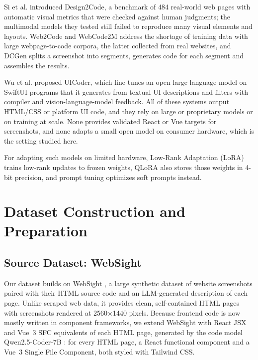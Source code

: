 \documentclass[conference,a4paper]{IEEEtran}
\begin{document}
Si et al. \cite{si2025design2code} introduced Design2Code, a benchmark of 484 real-world web pages with automatic visual metrics that were checked against human judgments; the multimodal models they tested still failed to reproduce many visual elements and layouts. Web2Code \cite{yun2024web2code} and WebCode2M \cite{gui2025webcode2m} address the shortage of training data with large webpage-to-code corpora, the latter collected from real websites, and DCGen \cite{wan2025dcgen} splits a screenshot into segments, generates code for each segment and assembles the results.

Wu et al. \cite{wu2024uicoder} proposed UICoder, which fine-tunes an open large language model on SwiftUI programs that it generates from textual UI descriptions and filters with compiler and vision-language-model feedback. All of these systems output HTML/CSS or platform UI code, and they rely on large or proprietary models or on training at scale. None provides validated React or Vue targets for screenshots, and none adapts a small open model on consumer hardware, which is the setting studied here.

For adapting such models on limited hardware, Low-Rank Adaptation (LoRA) \cite{hu2021lora} trains low-rank updates to frozen weights, QLoRA \cite{dettmers2023qlora} also stores those weights in 4-bit precision, and prompt tuning \cite{lester2021power} optimizes soft prompts instead.

 
\section{Dataset Construction and Preparation}
\label{sec:data}
\subsection{Source Dataset: WebSight}
\label{subsec:source-websight}

Our dataset builds on WebSight \cite{laurencon2024unlocking}, a large synthetic dataset of website screenshots paired with their HTML source code and an LLM-generated description of each page. Unlike scraped web data, it provides clean, self-contained HTML pages with screenshots rendered at 2560$\times$1440 pixels. Because frontend code is now mostly written in component frameworks, we extend WebSight with React JSX and Vue~3 SFC equivalents of each HTML page, generated by the code model Qwen2.5-Coder-7B \cite{hui2024qwen25coder}: for every HTML page, a React functional component and a Vue~3 Single File Component, both styled with Tailwind CSS.
\end{document}
